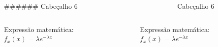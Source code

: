 \documentclass[
]{book}
\begin{document}
\begin{columns}

\begin{column}

\#\#\#\#\#\# Cabeçalho 6

\end{column}

\begin{column}

~

\end{column}

\begin{column}

\hypertarget{cabeuxe7alho-6}{}
\begin{section}

Cabeçalho 6

\end{section}

\end{column}

\end{columns}

\begin{columns}

\begin{column}

Expressão matemática:
\(f_x(x) = \lambda e^{- \lambda x}\)

\end{column}

\begin{column}

~

\end{column}

\begin{column}

Expressão matemática: {\(f_x(x) = \lambda e^{- \lambda x}\)}

\end{column}

\end{columns}
\end{document}
